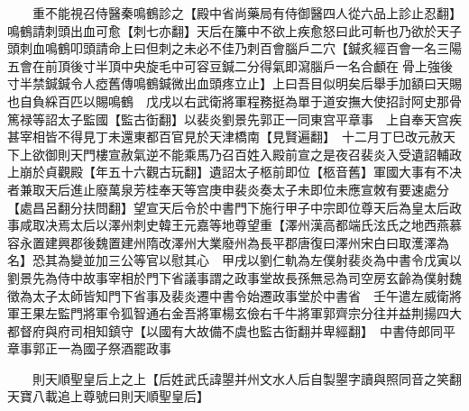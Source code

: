 　　重不能視召侍醫秦鳴鶴診之【殿中省尚藥局有侍御醫四人從六品上診止忍翻】鳴鶴請刺頭出血可愈【刺七亦翻】天后在簾中不欲上疾愈怒曰此可斬也乃欲於天子頭刺血鳴鶴叩頭請命上曰但刺之未必不佳乃刺百會腦戶二穴【鍼炙經百會一名三陽五會在前頂後寸半頂中央旋毛中可容豆鍼二分得氣即瀉腦戶一名合顱在骨上強後寸半禁鍼鍼令人瘂舊傳鳴鶴鍼微出血頭疼立止】上曰吾目似明矣后舉手加額曰天賜也自負綵百匹以賜鳴鶴　戊戌以右武衛將軍程務挺為單于道安撫大使招討阿史那骨篤禄等詔太子監國【監古衘翻】以裴炎劉景先郭正一同東宫平章事　上自奉天宫疾甚宰相皆不得見丁未還東都百官見於天津橋南【見賢遍翻】　十二月丁巳改元赦天下上欲御則天門樓宣赦氣逆不能乘馬乃召百姓入殿前宣之是夜召裴炎入受遺詔輔政上崩於貞觀殿【年五十六觀古玩翻】遺詔太子柩前即位【柩音舊】軍國大事有不决者兼取天后進止廢萬泉芳桂奉天等宫庚申裴炎奏太子未即位未應宣敇有要速處分【處昌呂翻分扶問翻】望宣天后令於中書門下施行甲子中宗即位尊天后為皇太后政事咸取决焉太后以澤州刺史韓王元嘉等地尊望重【澤州漢高都端氏泫氏之地西燕慕容永置建興郡後魏置建州隋改澤州大業廢州為長平郡唐復曰澤州宋白曰取濩澤為名】恐其為變並加三公等官以慰其心　甲戌以劉仁軌為左僕射裴炎為中書令戊寅以劉景先為侍中故事宰相於門下省議事謂之政事堂故長孫無忌為司空房玄齡為僕射魏徵為太子太師皆知門下省事及裴炎遷中書令始遷政事堂於中書省　壬午遣左威衛將軍王果左監門將軍令狐智通右金吾將軍楊玄儉右千牛將軍郭齊宗分往并益荆揚四大都督府與府司相知鎮守【以國有大故備不虞也監古衘翻并卑經翻】　中書侍郎同平章事郭正一為國子祭酒罷政事

　　則天順聖皇后上之上【后姓武氏諱曌并州文水人后自製曌字讀與照同音之笑翻天寶八載追上尊號曰則天順聖皇后】

